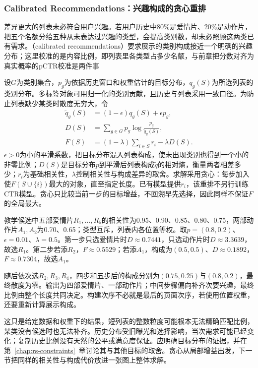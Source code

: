 \subsubsection{Calibrated Recommendations：兴趣构成的贪心重排}
\label{sec:rs-calibrated-recommendations}

差异更大的列表未必符合用户兴趣。若用户历史中80\%是爱情片、20\%是动作片，把五个名额分给五种从未表达过兴趣的类型，会提高类别数，却未必照顾这两类已有需求。（calibrated recommendations）要求展示的类别构成接近一个明确的兴趣分布；这里校准的是内容比例，即列表里各类型占多少名额，与前章把分数对齐为真实概率的pCTR校准是两件事

设$G$为类别集合，$p_g$为依据历史窗口和权重估计的目标分布，$q_g(S)$为所选列表的类别分布。多标签对象可用归一化的类别贡献，且历史与列表采用一致口径。为防止列表缺少某类时散度无穷大，令
\begin{align}
 \widetilde q_g(S)&=(1-\epsilon)q_g(S)+\epsilon p_g,\\
 D(S)&=\sum_{g\in G}p_g\log\frac{p_g}{\widetilde q_g(S)},\\
 F(S)&=(1-\lambda)\sum_{i\in S}r_i-\lambda D(S).
 \label{eq:rs-calibrated-greedy}
\end{align}
$\epsilon>0$为小的平滑系数，把目标分布混入列表构成，使未出现类别也得到一个小的非零比例；$D(S)$是目标分布$p$到平滑后列表构成$\widetilde q$的相对熵，衡量两者相差多少；$r_i$为基础相关性，$\lambda$控制相关性与构成差异的取舍。求解采用贪心：每步加入使$F(S\cup\{i\})$最大的对象，直至指定长度。已有模型提供$r_i$，该重排不另行训练CTR模型。贪心只比较当前一步的目标增益，不回溯早先选择，因此同样不保证$F$的全局最大。

教学候选中五部爱情片$R_1,\ldots,R_5$的相关性为0.95、0.90、0.85、0.80、0.75，两部动作片$A_1,A_2$为0.70、0.65；类型互斥，列表内各位置等权。取$p=(0.8,0.2)$、$\epsilon=0.01$、$\lambda=0.5$。第一步只选爱情片时$D\approx0.7441$，只选动作片时$D\approx3.3639$，故选$R_1$。第二步若添$R_2$，$F\approx0.5529$；若添$A_1$，构成为$(0.5,0.5)$、$D\approx0.1892$，$F\approx0.7304$，故选$A_1$。

随后依次选$R_2,R_3,R_4$，四步和五步后的构成分别为$(0.75,0.25)$与$(0.8,0.2)$，最终散度为零。输出为四部爱情片、一部动作片；中间步骤偏向补齐次要兴趣，最终比例由整个长度共同决定。构建次序不必就是最后的页面次序，若使用位置权重，还要重新计算展示构成。

这只是给定数据和权重下的结果，短列表的整数粒度可能根本无法精确匹配比例，某类没有候选时也无法补齐。历史分布受旧曝光和选择影响，当次需求可能已经变化；复制历史比例没有天然的公平或满意度保证。应明确目标分布的证据，并在第~\ref{chap:rs-constraints}~章讨论其与其他目标的取舍。贪心从局部增益出发，下一节把同样的相关性与构成代价放进一张图上整体求解。

